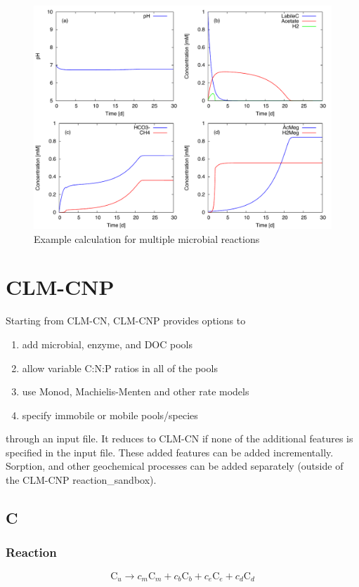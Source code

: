 \documentclass[12pt, a4paper]{article}
\begin{document}
\begin{figure}[h]
\centering
\includegraphics[width=1.0\textwidth]{../microbial/comp.pdf}
\caption{Example calculation for multiple microbial reactions}
\label{Fig5}
\end{figure}

\clearpage
\section{CLM-CNP}
Starting from CLM-CN, CLM-CNP provides options to
\begin{enumerate}
\item add microbial, enzyme, and DOC pools
\item allow variable C:N:P ratios in all of the pools
\item use Monod, Machielis-Menten and other rate models
\item specify immobile or mobile pools/species
\end{enumerate}

through an input file. It reduces to CLM-CN if none of the additional features is specified in the input file. These added features can be added incrementally. Sorption, and other geochemical processes can be added separately (outside of the CLM-CNP reaction\_sandbox).





\subsection{C}
\subsubsection{Reaction}
\begin{equation}
\label{rxnc}
\text{C}_u \rightarrow c_m\text{C}_m + c_b\text{C}_b + c_e \text{C}_e + c_d \text{C}_d
\end{equation}
\end{document}
